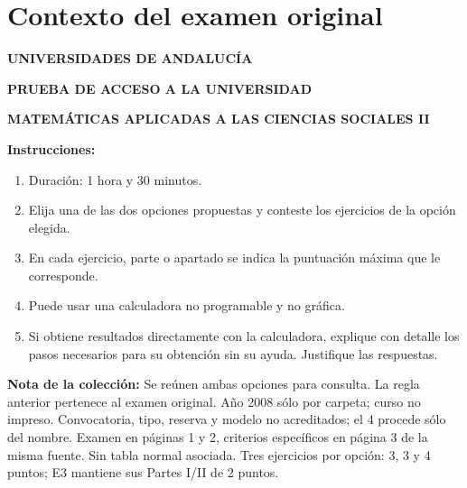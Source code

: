 \section*{Contexto del examen original}
\textbf{UNIVERSIDADES DE ANDALUCÍA}\par
\textbf{PRUEBA DE ACCESO A LA UNIVERSIDAD}\par
\textbf{MATEMÁTICAS APLICADAS A LAS CIENCIAS SOCIALES II}

\textbf{Instrucciones:}
\begin{enumerate}[label=\textbf{\alph*)}]
  \item Duración: 1 hora y 30 minutos.
  \item Elija una de las dos opciones propuestas y conteste los ejercicios de la opción elegida.
  \item En cada ejercicio, parte o apartado se indica la puntuación máxima que le corresponde.
  \item Puede usar una calculadora no programable y no gráfica.
  \item Si obtiene resultados directamente con la calculadora, explique con detalle los pasos necesarios para su obtención sin su ayuda. Justifique las respuestas.
\end{enumerate}
\noindent\textbf{Nota de la colección:} Se reúnen ambas opciones para consulta. La regla anterior pertenece al examen original. Año 2008 sólo por carpeta; curso no impreso. Convocatoria, tipo, reserva y modelo no acreditados; el 4 procede sólo del nombre. Examen en páginas 1 y 2, criterios específicos en página 3 de la misma fuente. Sin tabla normal asociada. Tres ejercicios por opción: 3, 3 y 4 puntos; E3 mantiene sus Partes I/II de 2 puntos.
\par\medskip

